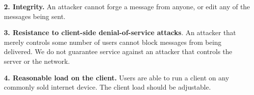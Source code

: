 \textbf{2. Integrity.} An attacker cannot forge a message from anyone, or edit any of the messages being sent.

\textbf{3. Resistance to client-side denial-of-service attacks}. An attacker that merely controls some number of users cannot block messages from being delivered. We do not guarantee service against an attacker that controls the server or the network.

\textbf{4. Reasonable load on the client.} Users are able to run a client on any commonly sold internet device. The client load should be adjustable.

